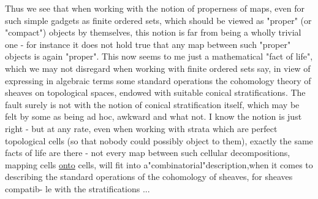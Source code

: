 
Thus we see that when working with the notion of properness of
maps, even for such simple gadgets as finite ordered sets, which 
should be viewed as "proper" (or "compact") objects by themselves,
this notion is far from being a wholly trivial one - for instance it
does not hold true that any map between such "proper" objects is again
"proper". This now seems to me just a mathematical "fact of life",
which we may not disregard when working with finite ordered sets say,
in view of expressing in algebraic terms some standard operations 
the cohomology theory of sheaves on topological spaces, endowed with
suitable conical stratifications. The fault surely is not with the
notion of conical stratification itself, which may be felt by some
as being ad hoc, awkward and what not. I know the notion is just
right - but at any rate, even when working with strata which are
perfect topological cells (so that nobody could possibly object to
them), exactly the same facts of life are there - \hand{(}not every map 
between such cellular decompositions, mapping cells \uline{onto} cells, will
fit into a"combinatorial"description,when it comes to describing the
standard operations of the cohomology of sheaves, for sheaves compatib-%
le with the stratifications ...


